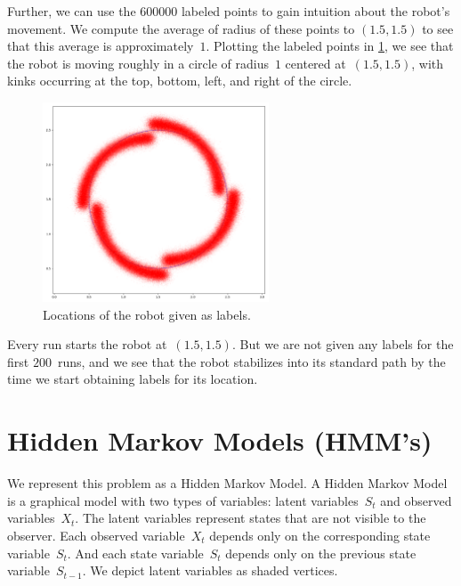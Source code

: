 \documentclass[twoside]{article}
\begin{document}
Further, we can use the $\num{600000}$ labeled points to gain intuition about the robot's movement.
We compute the average of radius of these points to $(1.5, 1.5)$ to see that this average is approximately~$1$.
Plotting the labeled points in \cref{fig:label-locations}, we see that the robot is moving roughly in a circle of radius~$1$ centered at~$(1.5, 1.5)$, with kinks occurring at the top, bottom, left, and right of the circle.
\begin{figure}[h]
  \centering
  \includegraphics[width=0.6\textwidth]{images/label-locations}
  \caption{Locations of the robot given as labels.}\label{fig:label-locations}
\end{figure}

Every run starts the robot at~$(1.5, 1.5)$.
But we are not given any labels for the first $200$~runs, and we see that the robot stabilizes into its standard path by the time we start obtaining labels for its location.

\section{Hidden Markov Models (HMM's)}\label{sec:hidden-markov-models}

We represent this problem as a Hidden Markov Model.
A Hidden Markov Model is a graphical model with two types of variables: latent variables~$S_t$ and observed variables~$X_t$.
The latent variables represent states that are not visible to the observer.
Each observed variable~$X_t$ depends only on the corresponding state variable~$S_t$.
And each state variable~$S_t$ depends only on the previous state variable~$S_{t-1}$.
We depict latent variables as shaded vertices.
\end{document}
